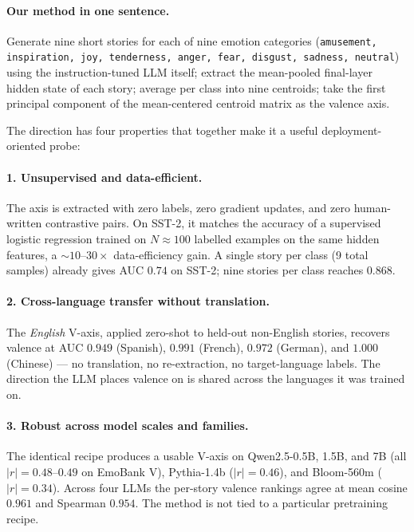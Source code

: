 \paragraph{Our method in one sentence.}
Generate nine short stories for each of nine emotion categories
(\texttt{amusement, inspiration, joy, tenderness, anger, fear, disgust,
sadness, neutral}) using the instruction-tuned LLM itself; extract the
mean-pooled final-layer hidden state of each story; average per class into
nine centroids; take the first principal component of the mean-centered
centroid matrix as the valence axis.

The direction has four properties that together make it a useful
deployment-oriented probe:

\paragraph{1. Unsupervised and data-efficient.}
The axis is extracted with zero labels, zero gradient updates, and zero
human-written contrastive pairs. On SST-2, it matches the accuracy of a
supervised logistic regression trained on $N\!\approx\!100$ labelled
examples on the same hidden features, a $\sim\!10$--$30\times$
data-efficiency gain. A single story per class (9 total samples) already
gives AUC $0.74$ on SST-2; nine stories per class reaches $0.868$.

\paragraph{2. Cross-language transfer without translation.}
The \emph{English} V-axis, applied zero-shot to held-out non-English
stories, recovers valence at AUC $0.949$ (Spanish), $0.991$ (French),
$0.972$ (German), and \emph{$1.000$} (Chinese) --- no translation, no
re-extraction, no target-language labels. The direction the LLM places
valence on is shared across the languages it was trained on.

\paragraph{3. Robust across model scales and families.}
The identical recipe produces a usable V-axis on Qwen2.5-0.5B, 1.5B, and
7B (all $|r|\!=\!0.48$--$0.49$ on EmoBank V), Pythia-1.4b ($|r|\!=\!0.46$),
and Bloom-560m ($|r|\!=\!0.34$). Across four LLMs the per-story valence
rankings agree at mean cosine $0.961$ and Spearman $0.954$. The method is
not tied to a particular pretraining recipe.


